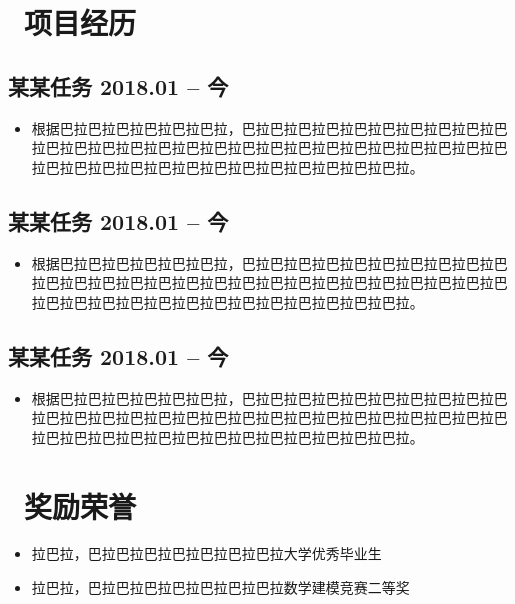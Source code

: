 \documentclass{style/resume}
\newcommand{\datestyle}[1]{
        \normalsize #1
    }
\newcommand{\projecthead}[2]{
        \subsection[#1]{\textbf{#1} \hspace{\stretch{1}} \datestyle{#2}}
    }
\begin{document}
    \section{\faGithubAlt\ 项目经历}
    \projecthead{某某任务}{2018.01 -- 今}
    \begin{itemize}
      \item 根据巴拉巴拉巴拉巴拉巴拉巴拉，巴拉巴拉巴拉巴拉巴拉巴拉巴拉巴拉巴拉巴拉巴拉巴拉巴拉巴拉巴拉巴拉巴拉巴拉巴拉巴拉巴拉巴拉巴拉巴拉巴拉巴拉巴拉巴拉巴拉巴拉巴拉巴拉巴拉巴拉巴拉巴拉巴拉巴拉巴拉巴拉。
    \end{itemize}

    \projecthead{某某任务}{2018.01 -- 今}
    \begin{itemize}
      \item 根据巴拉巴拉巴拉巴拉巴拉巴拉，巴拉巴拉巴拉巴拉巴拉巴拉巴拉巴拉巴拉巴拉巴拉巴拉巴拉巴拉巴拉巴拉巴拉巴拉巴拉巴拉巴拉巴拉巴拉巴拉巴拉巴拉巴拉巴拉巴拉巴拉巴拉巴拉巴拉巴拉巴拉巴拉巴拉巴拉巴拉巴拉。
    \end{itemize}

    \projecthead{某某任务}{2018.01 -- 今}
    \begin{itemize}
      \item 根据巴拉巴拉巴拉巴拉巴拉巴拉，巴拉巴拉巴拉巴拉巴拉巴拉巴拉巴拉巴拉巴拉巴拉巴拉巴拉巴拉巴拉巴拉巴拉巴拉巴拉巴拉巴拉巴拉巴拉巴拉巴拉巴拉巴拉巴拉巴拉巴拉巴拉巴拉巴拉巴拉巴拉巴拉巴拉巴拉巴拉巴拉。
    \end{itemize}



    \section{\faCertificate\ 奖励荣誉}
    \begin{itemize}
      \item 拉巴拉，巴拉巴拉巴拉巴拉巴拉巴拉巴拉大学优秀毕业生
      \item 拉巴拉，巴拉巴拉巴拉巴拉巴拉巴拉巴拉数学建模竞赛二等奖
    \end{itemize}




    
    
    
    
\end{document}
